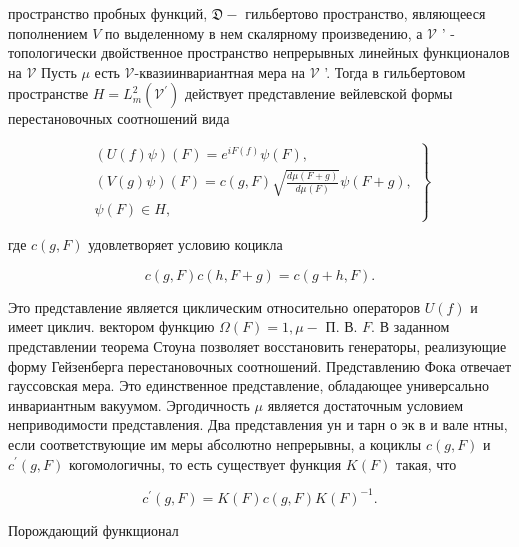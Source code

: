 \documentclass[10pt]{article}
\begin{document}
пространство пробных функций, $\mathfrak{D}-$ гильбертово пространство, являющееся пополнением $V$ по выделенному в нем скалярному произведению, а $\mathscr{V}$ ' - топологически двойственное пространство непрерывных линейных функционалов на $\mathscr{V}$ Пусть $\mu$ есть $\mathcal{V}$-квазиинвариантная мера на $\mathscr{V}$ '. Тогда в гильбертовом пространстве $H=L_{m}^{2}\left(\mathscr{V}^{\prime}\right)$ действует представление вейлевской формы перестановочных соотношений вида



\[

\left.\begin{array}{c}

(U(f) \psi)(F)=e^{i F(f)} \psi(F), \\

(V(g) \psi)(F)=c(g, F) \sqrt{\frac{d \mu(F+g)}{d \mu(F)}} \psi(F+g), \\

\psi(F) \in H,

\end{array}\right\}

\]



где $c(g, F)$ удовлетворяет условию коцикла



\[

c(g, F) c(h, F+g)=c(g+h, F) .

\]



Это представление является циклическим относительно операторов $U(f)$ и имеет циклич. вектором функцию $\Omega(F)=1, \mu-$ П. В. $F$. В заданном представлении теорема Стоуна позволяет восстановить генераторы, реализующие форму Гейзенберга перестановочных соотношений. Представлению Фока отвечает гауссовская мера. Это единственное представление, обладающее универсально инвариантным вакуумом. Эргодичность $\mu$ является достаточным условием неприводимости представления. Два представления ун и тарн о эк в и вале нтны, если соответствующие им меры абсолютно непрерывны, а коциклы $c(g, F)$ и $c^{\prime}(g, F)$ когомологичны, то есть существует функция $K(F)$ такая, что



\[

c^{\prime}(g, F)=K(F) c(g, F) K(F)^{-1} .

\]



Порождающий функщионал
\end{document}
